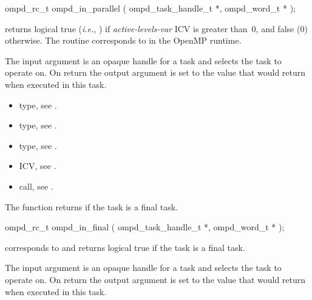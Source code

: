 \format
\begin{cspecific}
\begin{ompSyntax}
ompd_rc_t ompd_in_parallel (
  ompd_task_handle_t *,
  ompd_word_t *
);
\end{ompSyntax}
\end{cspecific}

\descr
{} returns logical true (\textit{i.e.}, )
if \emph{active-levels-var}
ICV is greater than~0, and false (0) otherwise.
The routine corresponds to  in the OpenMP runtime.

\argdesc
The input argument  is an opaque handle for a task and selects the task to operate on.
On return the output argument  is set to the value that  would return when
executed in this task.

\crossreferences
\begin{itemize}
  \item {} type, see .
	\item {} type, see .
	\item {} type, see .
	\item {} ICV, see .
	\item {} call, see .
\end{itemize}


\label{subsubsubsec:ompd_in_final}
\summary
The  function returns  if the task is a final task.

\format
\begin{cspecific}
\begin{ompSyntax}
ompd_rc_t ompd_in_final (
  ompd_task_handle_t *,
  ompd_word_t *
);
\end{ompSyntax}
\end{cspecific}

\descr
{} corresponds to  and returns
logical true if the task is a final task.

\argdesc
The input argument  is an opaque handle for a task and selects the task to operate on.
On return the output argument  is set to the value that  would return when
executed in this task.

